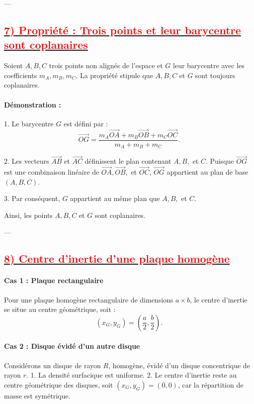 \documentclass{article}
\begin{document}
---

\subsection*{\underline{\textbf{\textcolor{red}{7) Propriété : Trois points et leur barycentre sont coplanaires}}}}

Soient \( A, B, C \) trois points non alignés de l’espace et \( G \) leur barycentre avec les coefficients \( m_A, m_B, m_C \).  
La propriété stipule que \( A, B, C \) et \( G \) sont toujours coplanaires.

\paragraph{Démonstration :}  
1. Le barycentre \( G \) est défini par :  
   \[
   \overrightarrow{OG} = \frac{m_A\overrightarrow{OA} + m_B\overrightarrow{OB} + m_C\overrightarrow{OC}}{m_A + m_B + m_C}.
   \]

2. Les vecteurs \( \overrightarrow{AB} \) et \( \overrightarrow{AC} \) définissent le plan contenant \( A, B, \) et \( C \).  
   Puisque \( \overrightarrow{OG} \) est une combinaison linéaire de \( \overrightarrow{OA}, \overrightarrow{OB}, \) et \( \overrightarrow{OC} \), \( \overrightarrow{OG} \) appartient au plan de base \( (A, B, C) \).

3. Par conséquent, \( G \) appartient au même plan que \( A, B, \) et \( C \).  

Ainsi, les points \( A, B, C \) et \( G \) sont coplanaires.

---

\subsection*{\underline{\textbf{\textcolor{red}{8) Centre d’inertie d’une plaque homogène}}}}

\paragraph{Cas 1 : Plaque rectangulaire}  
Pour une plaque homogène rectangulaire de dimensions \( a \times b \), le centre d’inertie se situe au centre géométrique, soit :  
\[
(x_G, y_G) = \left(\frac{a}{2}, \frac{b}{2}\right).
\]

\paragraph{Cas 2 : Disque évidé d’un autre disque}  
Considérons un disque de rayon \( R \), homogène, évidé d’un disque concentrique de rayon \( r \).  
1. La densité surfacique est uniforme.  
2. Le centre d’inertie reste au centre géométrique des disques, soit \( (x_G, y_G) = (0, 0) \), car la répartition de masse est symétrique.
\end{document}

